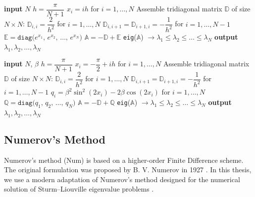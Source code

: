 \documentclass[11pt,a4paper,oneside,openright]{report} %
\begin{document}
\begin{algorithm}[H]
\caption{Finite Difference method - Paine equation}
\label{alg_1} 
{\small
\begin{algorithmic}[1]
\State \textbf{input} $N$
\State $h = \dfrac{\pi}{N + 1}$
\State $x_i = i h$ \quad for $i = 1, \dots,N$
\BlankLine
\State Assemble tridiagonal matrix $\mathbb{D}$ of size $N \times N$:
\State \quad $\mathbb{D}_{i,i} = \dfrac{2}{h^2}$ \quad for $i=1, \dots,N$
\State \quad $\mathbb{D}_{i,i+1} = \mathbb{D}_{i+1,i} = -\dfrac{1}{h^2}$ \quad for $i = 1, \dots,N-1$
\BlankLine
\State $\mathbb{E} = \texttt{diag}\big(e^{x_1},  \, e^{x_2},  \, \dots,  \, e^{x_N} \big)$
\State $\mathbb{A} = -\mathbb{D} + \mathbb{E}$
\BlankLine
\State \texttt{eig}($\mathbb{A}$) $ \to \lambda_1 \leq \lambda_2 \leq \dots \leq \lambda_N$ 
\State \textbf{output} $\lambda_1, \lambda_2, \dots, \lambda_N$
\end{algorithmic}
}
\end{algorithm}

\begin{algorithm}[H]
\caption{Finite Difference method - Coffey--Evans equation}
\label{alg_2}
{\small
\begin{algorithmic}[1]
\State \textbf{input} $N$, $\beta$
\State $h = \dfrac{\pi}{N + 1}$
\State $x_i = -\dfrac{\pi}{2} + i h$ \quad for $i = 1, \dots,N$
\BlankLine
\State Assemble tridiagonal matrix $\mathbb{D}$ of size $N \times N$:
\State \quad $\mathbb{D}_{i,i}   = \dfrac{2}{h^2}$ \quad for $i=1, \dots,N$
\State \quad $\mathbb{D}_{i,i+1} = \mathbb{D}_{i+1,i} = -\dfrac{1}{h^2}$  \quad for $i=1, \dots,N-1$
\BlankLine
\State $q_i = \beta^2 \sin^2(2 x_i) - 2 \beta \cos(2 x_i)$ \quad for $i=1, \dots,N$
\State $\mathbb{Q} = \texttt{diag}\big(q_1,  \, q_2,  \, \dots,  \, q_N \big)$
\State $\mathbb{A} = -\mathbb{D} + \mathbb{Q}$
\BlankLine
\State \texttt{eig}($\mathbb{A}$) $ \to \lambda_1 \leq \lambda_2 \leq \dots \leq \lambda_N$
\State \textbf{output} $\lambda_1, \lambda_2, \dots, \lambda_N$
\end{algorithmic}
}
\end{algorithm}

\subsection{Numerov's Method}
\noindent
Numerov's method (Num) is based on a higher-order Finite Difference scheme. The original formulation was proposed by B. V. Numerov in 1927 \cite{numerov1927}. In this thesis, we use a modern adaptation of Numerov's method designed for the numerical solution of Sturm--Liouville eigenvalue problems \cite{numerov}.
\end{document}
